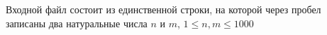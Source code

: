 Входной файл состоит из единственной строки, на которой через пробел записаны два натуральные числа $n$ и $m$, $1 \le n, m \le 1000$